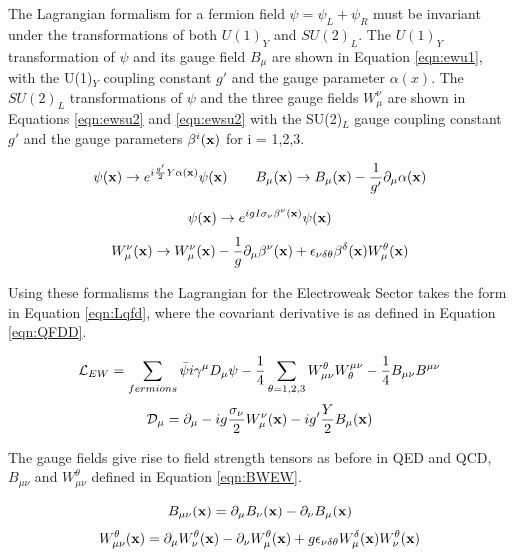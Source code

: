 The Lagrangian formalism for a fermion field $\psi = \psi_{L} + \psi_{R}$ must be invariant under the transformations of both $U(1)_{Y}$ and $SU(2)_{L}$. The $U(1)_{Y}$ transformation of $\psi$ and its gauge field $B_{\mu}$ are shown in Equation \ref{eqn:ewu1}, with the U(1)$_{Y}$ coupling constant $g'$ and the gauge parameter $\alpha(x)$. The $SU(2)_{L}$ transformations of $\psi$ and the three gauge fields $W^{\nu}_{\mu}$ are shown in Equations \ref{eqn:ewsu2} and \ref{eqn:ewsu2} with the SU(2)$_{L}$ gauge coupling constant $g'$ and the gauge parameters $\beta^{i}(\mathbf{x})$ for i = 1,2,3.

\begin{equation}
\psi(\mathbf{x}) \rightarrow e^{i\frac{g'}{2}Y\alpha (\mathbf{x})}\psi(\mathbf{x}) \qquad B_{\mu}(\mathbf{x}) \rightarrow B_{\mu}(\mathbf{x}) - \frac{1}{g'}\partial_{\mu}\alpha(\mathbf{x})
\label{eqn:ewu1}
\end{equation}

\begin{equation}
\psi(\mathbf{x}) \rightarrow e^{igI\sigma_{\nu} \beta^{\nu} (\mathbf{x})}\psi(\mathbf{x})
\label{eqn:ewsu2}
\end{equation}
\begin{equation}
W_{\mu}^{\nu}(\mathbf{x}) \rightarrow W_{\mu}^{\nu}(\mathbf{x}) - \frac{1}{g}\partial_{\mu}\beta^{\nu}(\mathbf{x}) + \epsilon_{\nu \delta \theta}\beta^{\delta}(\mathbf{x})W_{\mu}^{\theta}(\mathbf{x})
\label{eqn:ewsu3}
\end{equation}

Using these formalisms the Lagrangian for the Electroweak Sector takes the form in Equation \ref{eqn:Lqfd}, where the covariant derivative is as defined in Equation \ref{eqn:QFDD}. 

\begin{equation}
{\mathcal{L}}_{EW} = \sum_{fermions} \bar{\psi}i\gamma^{\mu}D_{\mu}\psi - \frac{1}{4}\sum_{\theta = 1,2,3} W^{\theta}_{\mu\nu}W_{\theta}^{\mu\nu} - \frac{1}{4}B_{\mu\nu}B^{\mu\nu}
\label{eqn:Lqfd}
\end{equation}
\begin{equation}
\mathcal{D}_{\mu} = \partial_{\mu}-ig\frac{\sigma_{\nu}}{2}W_{\mu}^{\nu}(\mathbf{x}) - ig'\frac{Y}{2}B_{\mu}(\mathbf{x})
\label{eqn:QFDD}
\end{equation}

The gauge fields give rise to field strength tensors as before in QED and QCD, $B_{\mu\nu}$ and $W_{\mu\nu}^{\theta}$ defined in Equation \ref{eqn:BWEW}. 

\begin{equation}
B_{\mu\nu}(\mathbf{x}) = \partial_{\mu}B_{\nu}(\mathbf{x}) - \partial_{\nu}B_{\mu}(\mathbf{x})
\end{equation}
\begin{equation}
W_{\mu\nu}^{\theta}(\mathbf{x}) = \partial_{\mu}W_{\nu}^{\theta}(\mathbf{x}) - \partial_{\nu}W_{\mu}^{\theta}(\mathbf{x}) + g\epsilon_{\nu \delta \theta}W_{\mu}^{\delta}(\mathbf{x})W_{\nu}^{\theta}(\mathbf{x})
\label{eqn:BWEW}
\end{equation}

